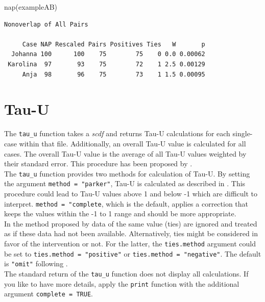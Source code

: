 \documentclass[
]{book}
\newenvironment{Shaded}{\begin{snugshade}}{\end{snugshade}}
\newcommand{\FunctionTok}[1]{\textcolor[rgb]{0.00,0.00,0.00}{#1}}
\newcommand{\NormalTok}[1]{#1}
\begin{document}
\begin{Shaded}
\begin{Highlighting}[]
\FunctionTok{nap}\NormalTok{(exampleAB)}
\end{Highlighting}
\end{Shaded}

\begin{verbatim}
Nonoverlap of All Pairs

     Case NAP Rescaled Pairs Positives Ties   W       p
  Johanna 100      100    75        75    0 0.0 0.00062
 Karolina  97       93    75        72    1 2.5 0.00129
     Anja  98       96    75        73    1 1.5 0.00095
\end{verbatim}

\hypertarget{tau-u}{%
\section{Tau-U}\label{tau-u}}

The \texttt{tau\_u} function takes a \emph{scdf} and returns Tau-U calculations for each single-case within that file. Additionally, an overall Tau-U value is calculated for all cases. The overall Tau-U value is the average of all Tau-U values weighted by their standard error. This procedure has been proposed by \citet{parker_combining_2011}.\\
The \texttt{tau\_u} function provides two methods for calculation of Tau-U. By setting the argument \texttt{method\ =\ "parker"}, Tau-U is calculated as described in \citet{parker_combining_2011}. This procedure could lead to Tau-U values above 1 and below -1 which are difficult to interpret. \texttt{method\ =\ "complete}, which is the default, applies a correction that keeps the values within the -1 to 1 range and should be more appropriate.\\
In the method proposed by \citet{parker_combining_2011} data of the same value (ties) are ignored and treated as if these data had not been available. Alternatively, ties might be considered in favor of the intervention or not. For the latter, the \texttt{ties.method} argument could be set to \texttt{ties.method\ =\ "positive"} or \texttt{ties.method\ =\ "negative"}. The default is \texttt{"omit"} following \citet{parker_combining_2011}.\\
The standard return of the \texttt{tau\_u} function does not display all calculations. If you like to have more details, apply the \texttt{print} function with the additional argument \texttt{complete\ =\ TRUE}.
\end{document}
